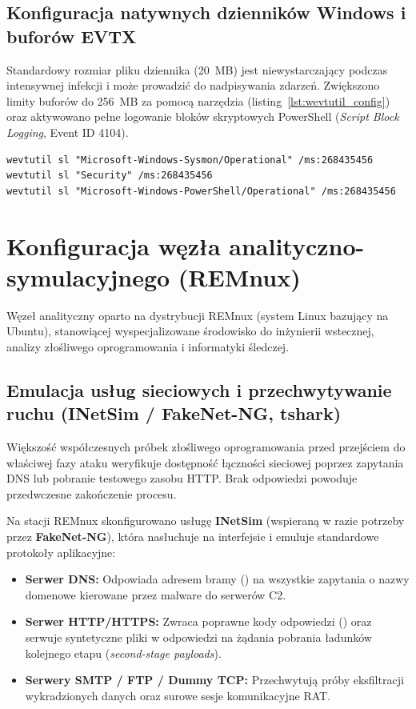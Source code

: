 \subsection{Konfiguracja natywnych dzienników Windows i buforów EVTX}\label{subsec:optymalizacja_evtx}

Standardowy rozmiar pliku dziennika  (20~MB) jest niewystarczający podczas intensywnej infekcji i może prowadzić do nadpisywania zdarzeń. Zwiększono limity buforów do 256~MB za pomocą narzędzia  (listing~\ref{lst:wevtutil_config}) oraz aktywowano pełne logowanie bloków skryptowych PowerShell (\textit{Script Block Logging}, Event ID 4104).

\begin{lstlisting}[style=terminal, caption={Zwiększenie maksymalnego rozmiaru buforów dzienników zdarzeń EVTX}, label={lst:wevtutil_config}]
wevtutil sl "Microsoft-Windows-Sysmon/Operational" /ms:268435456
wevtutil sl "Security" /ms:268435456
wevtutil sl "Microsoft-Windows-PowerShell/Operational" /ms:268435456
\end{lstlisting}

\section{Konfiguracja węzła analityczno-symulacyjnego (REMnux)}\label{sec:konfiguracja_remnux}

Węzeł analityczny oparto na dystrybucji REMnux (system Linux bazujący na Ubuntu), stanowiącej wyspecjalizowane środowisko do inżynierii wstecznej, analizy złośliwego oprogramowania i informatyki śledczej.

\subsection{Emulacja usług sieciowych i przechwytywanie ruchu (INetSim / FakeNet-NG, tshark)}\label{subsec:emulacja_sieci}

Większość współczesnych próbek złośliwego oprogramowania przed przejściem do właściwej fazy ataku weryfikuje dostępność łączności sieciowej poprzez zapytania DNS lub pobranie testowego zasobu HTTP. Brak odpowiedzi powoduje przedwczesne zakończenie procesu.

Na stacji REMnux skonfigurowano usługę \textbf{INetSim} (wspieraną w razie potrzeby przez \textbf{FakeNet-NG}), która nasłuchuje na interfejsie  i emuluje standardowe protokoły aplikacyjne:
\begin{itemize}
    \item \textbf{Serwer DNS:} Odpowiada adresem bramy () na wszystkie zapytania o nazwy domenowe kierowane przez malware do serwerów C2.
    \item \textbf{Serwer HTTP/HTTPS:} Zwraca poprawne kody odpowiedzi () oraz serwuje syntetyczne pliki w odpowiedzi na żądania pobrania ładunków kolejnego etapu (\textit{second-stage payloads}).
    \item \textbf{Serwery SMTP / FTP / Dummy TCP:} Przechwytują próby eksfiltracji wykradzionych danych oraz surowe sesje komunikacyjne RAT.
\end{itemize}

